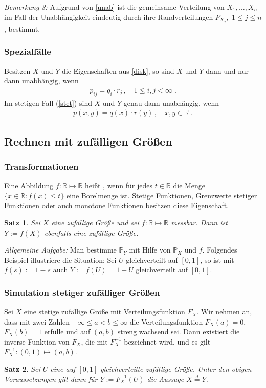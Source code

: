 \documentclass[ngerman,draft,parskip=half,twoside]{scrartcl}
\newtheorem{thm}{Satz}[section]
\newcommand*{\highl}[2][]{\textbf{\boldmath{#2}}%
  \ifthenelse{\equal{#1}{}}{\index{#2}}{\index{#1}}%
}
\newcommand*{\R}{\mathbb{R}}      %
\newcommand*{\WKM}{\mathbb{P}}      %
\begin{document}
\textit{Bemerkung 3:}
Aufgrund von \autoref{unab} ist die gemeinsame Verteilung von $X_1,\dotsc,X_n$
im Fall der Unabhängigkeit eindeutig durch ihre Randverteilungen $P_{X_j},$
$1\le j\le n$, bestimmt.

\subsubsection{Spezialfälle}

Besitzen $X$ und $Y$ die Eigenschaften aus \autoref{disk}, so sind $X$ und $Y$
dann und nur dann unabhängig, wenn
\begin{gather*}
  p_{ij}=q_i\cdot r_j\,,\quad 1\le i,j<\infty\;.
\end{gather*}
Im stetigen Fall (\autoref{stet}) sind $X$ und $Y$ genau dann unabhängig, wenn
\begin{gather*}
  p(x,y)=q(x)\cdot r(y)\,,\quad x,y\in\R\;.
\end{gather*}

\subsection{Rechnen mit zufälligen Größen}
\subsubsection{Transformationen}

Eine Abbildung $f\colon\R\mapsto\R$ heißt \highl{messbar}, wenn für jedes
$t\in\R$ die Menge $\{x\in \R \colon f(x)\le t\}$ eine Borelmenge ist. Stetige
Funktionen, Grenzwerte stetiger Funktionen oder auch monotone Funktionen
besitzen diese Eigenschaft.
\begin{thm}
  Sei $X$ eine zufällige Größe und sei $f\colon\R\mapsto\R$ messbar. Dann ist
  $Y:=f(X)$ ebenfalls eine zufällige Größe.
\end{thm}

\textit{Allgemeine Aufgabe:}
Man bestimme $\WKM_Y$ mit Hilfe von $\WKM_X$ und $f$. Folgendes Beispiel
illustriere die Situation: Sei $U$ gleichverteilt auf $[0,1]$, so ist mit
$f(s):=1-s$ auch $Y:=f(U)=1-U$ gleichverteilt auf $[0,1]$.

\subsubsection{Simulation stetiger zufälliger Größen}

Sei $X$ eine stetige zufällige Größe mit Verteilungsfunktion $F_X$. Wir nehmen
an, dass mit zwei Zahlen $-\infty\le a<b\le\infty$ die Verteilungsfunktion
$F_X(a)=0$, $F_X(b)=1$ erfülle und auf $(a,b)$ streng wachsend sei. Dann
existiert die inverse Funktion von $F_X$, die mit $F_X^{-1}$ bezeichnet wird,
und es gilt $F_X^{-1}\colon(0,1)\mapsto (a,b)$.
\begin{thm}
  Sei $U$ eine auf $[0,1]$ gleichverteilte zufällige Größe. Unter den obigen
  Voraussetzungen gilt dann für $Y:=F_X^{-1}(U)$ die Aussage $X\stackrel{d}{=}
  Y$.
\end{thm}
\end{document}
